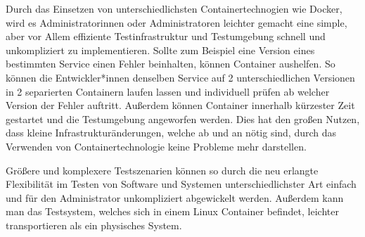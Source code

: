 
Durch das Einsetzen von unterschiedlichsten Containertechnogien wie Docker, wird es Administratorinnen oder Administratoren leichter gemacht eine simple, aber vor Allem effiziente Testinfrastruktur und Testumgebung schnell und unkompliziert zu implementieren. Sollte zum Beispiel eine Version eines bestimmten Service einen Fehler beinhalten, können Container aushelfen. So können die Entwickler*innen denselben Service auf 2 unterschiedlichen Versionen in 2 separierten Containern laufen lassen und individuell prüfen ab welcher Version der Fehler auftritt. Außerdem können Container innerhalb kürzester Zeit gestartet und die Testumgebung angeworfen werden. Dies hat den großen Nutzen, dass kleine Infrastrukturänderungen, welche ab und an nötig sind, durch das Verwenden von Containertechnologie keine Probleme mehr darstellen.

Größere und komplexere Testszenarien können so durch die neu erlangte Flexibilität im Testen von Software und Systemen unterschiedlichster Art einfach und für den Administrator unkompliziert abgewickelt werden. Außerdem kann man das Testsystem, welches sich in einem Linux Container befindet, leichter transportieren als ein physisches System. \cite{TestenContainer}

